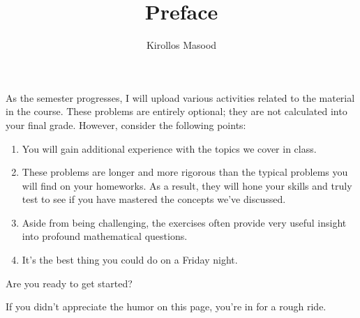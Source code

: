 \documentclass{ximera}
\title{Preface}
\author{Kirollos Masood}
\begin{document}
\begin{abstract}
\end{abstract}
\maketitle

\begin{sectionOutcomes}
	As the semester progresses, I will upload various activities related to the material in the course. These problems are entirely optional; they are not calculated into your final grade. However, consider the following points:
	\begin{enumerate}
		
		\item
		You will gain additional experience with the topics we cover in class.
		
		\item
		These problems are longer and more rigorous than the typical problems you will find on your homeworks. As a result, they will hone your skills and truly test to see if you have mastered the concepts we've discussed.
		
		\item
		Aside from being challenging, the exercises often provide very useful insight into profound mathematical questions.
		
		\item
		It's the best thing you could do on a Friday night.
		
	\end{enumerate}
	
\end{sectionOutcomes}

\begin{exercise}
	Are you ready to get started?
	\begin{multipleChoice}
	\end{multipleChoice}
	\begin{hint}
		If you didn't appreciate the humor on this page, you're in for a rough ride.
	\end{hint}
\end{exercise}
\end{document}

